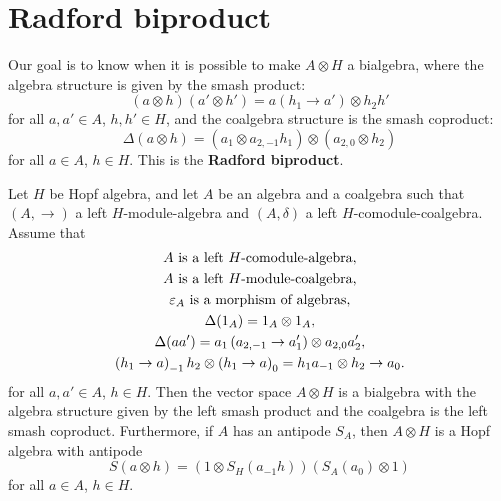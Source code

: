 \section{Radford biproduct}

Our goal is to know when it is possible to make $A\otimes H$ a bialgebra, where
the algebra structure is given by the smash product:
\[
(a\otimes h)(a'\otimes h')=a(h_{1}\to a')\otimes h_{2}h'
\]
for all $a,a'\in A$, $h,h'\in H$, and the coalgebra structure is
the smash coproduct:
\[
\Delta(a\otimes h)=(a_{1}\otimes a_{2,-1}h_{1})\otimes(a_{2,0}\otimes h_{2})
\]
for all $a\in A$, $h\in H$. This is the \textbf{Radford biproduct}.

\begin{theorem}[Radford]
\label{theorem:radford}
Let $H$ be Hopf algebra, and let $A$ be an algebra and a coalgebra such that
$(A,\rightarrow)$ a left $H$-module-algebra and $(A,\delta)$ a left
$H$-comodule-coalgebra.  Assume that 
\begin{gather}
A\text{ is a left \ensuremath{H}-comodule-algebra},\label{eq:radford_1}\\
A\text{ is a left \ensuremath{H}-module-coalgebra,}\label{eq:radford_2}\\
\varepsilon_{A}\text{ is a morphism of algebras,}\label{eq:radford_3}\\
\Delta(1_{A})=1_{A}\otimes1_{A},\label{eq:radford_4}\\
\Delta(aa')=a_{1}\left(a_{2,-1}\rightarrow a'_{1}\right)\otimes a_{2,0}a'_{2},\label{eq:radford_5}\\
\left(h_{1}\rightarrow a\right)_{-1}h_{2}\otimes\left(h_{1}\rightarrow a\right)_{0}=h_{1}a_{-1}\otimes h_{2}\rightarrow a_{0}.\label{eq:radford_6}
\end{gather}
for all $a,a'\in A$, $h\in H$.
Then the vector space $A\otimes H$ is a bialgebra with the algebra structure
given by the left smash product and the coalgebra is the left smash coproduct.
Furthermore, if $A$ has an antipode $S_A$, then $A\otimes H$ is a Hopf algebra
with antipode
\[
S(a\otimes h)=(1\otimes S_{H}(a_{-1}h))(S_{A}(a_{0})\otimes1)
\]
for all $a\in A$, $h\in H$.
\end{theorem}

